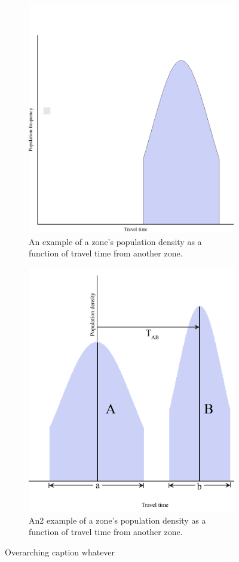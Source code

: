 \documentclass[notitlepage, 12pt]{article}
\begin{document}
\begin{figure}
\centering
\begin{subfigure}{.45\textwidth}
  \centering
  \includegraphics[width=0.9\linewidth]{B(t).png}
  \caption{An example of a zone's population density as a function of travel time from another zone.}
  \label{fig:sub1}
\end{subfigure}%
\hfill
\begin{subfigure}{.45\textwidth}
  \centering
  \includegraphics[width=0.9\linewidth]{A(t)B(t).png}
  \caption{An2 example of a zone's population density as a function of travel time from another zone.}
  \label{fig:sub2}
\end{subfigure}
\caption{Overarching caption whatever}
\label{fig:test}
\end{figure}
\end{document}
